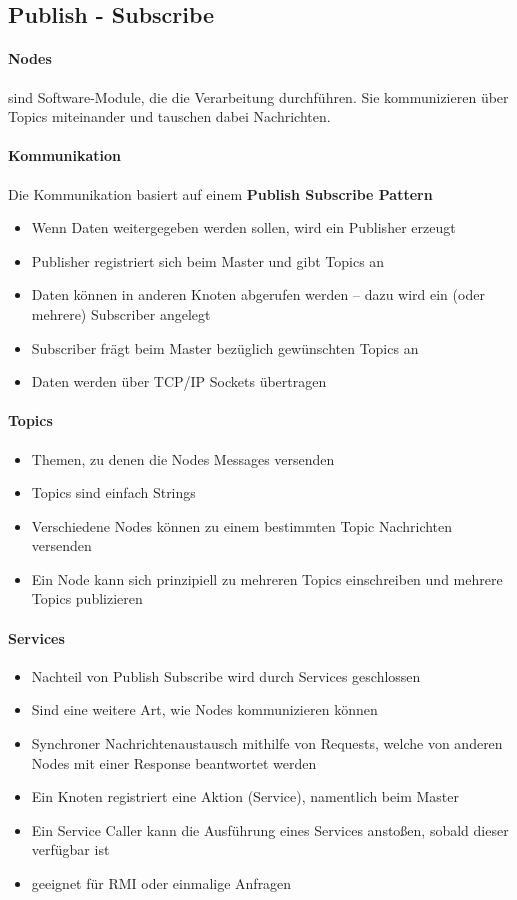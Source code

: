 \subsection{Publish - Subscribe}
\paragraph{Nodes} sind Software-Module, die die Verarbeitung durchführen. Sie kommunizieren über Topics miteinander und tauschen dabei Nachrichten.
\paragraph{Kommunikation}
Die Kommunikation basiert auf einem \textbf{Publish Subscribe Pattern}
\begin{itemize}
	\item Wenn Daten weitergegeben werden sollen, wird ein Publisher erzeugt
	\item Publisher registriert sich beim Master und gibt Topics an
	\item Daten können in anderen Knoten abgerufen werden -- dazu wird ein (oder mehrere) Subscriber angelegt
	\item Subscriber frägt beim Master bezüglich gewünschten Topics an
	\item Daten werden über TCP/IP Sockets übertragen
\end{itemize}
\paragraph{Topics}
\begin{itemize}
	\item Themen, zu denen die Nodes Messages versenden
	\item Topics sind einfach Strings
	\item Verschiedene Nodes können zu einem bestimmten Topic Nachrichten versenden
	\item Ein Node kann sich prinzipiell zu mehreren Topics einschreiben und mehrere Topics publizieren
\end{itemize}
\paragraph{Services}
\begin{itemize}
	\item Nachteil von Publish Subscribe wird durch Services geschlossen
	\item Sind eine weitere Art, wie Nodes kommunizieren können
	\item Synchroner Nachrichtenaustausch mithilfe von Requests, welche von anderen Nodes mit einer Response beantwortet werden
	\item Ein Knoten registriert eine Aktion (Service), namentlich beim Master
	\item Ein Service Caller kann die Ausführung eines Services anstoßen, sobald dieser verfügbar ist
	\item geeignet für RMI oder einmalige Anfragen
\end{itemize}
